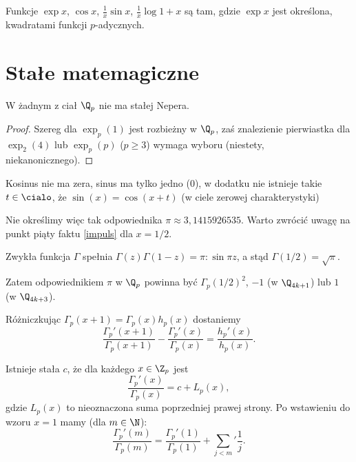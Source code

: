 \begin{fakt}
	Funkcje $\exp x$, $\cos x$, $\frac 1x\sin x$, $\frac 1 x \log 1 + x$ są tam, gdzie $\exp x$ jest określona, kwadratami funkcji $p$-adycznych. %
\end{fakt}

\section{Stałe matemagiczne}
\begin{fakt}
	W żadnym  z ciał $\Q_p$ nie ma stałej Nepera.
\end{fakt}

\begin{proof}
	Szereg  dla $\exp_p(1)$ jest rozbieżny w $\Q_p$, zaś znalezienie pierwiastka dla $\exp_2(4)$ lub $\exp_p(p)$ ($p \ge 3$) wymaga  wyboru (niestety, niekanonicznego).
\end{proof}

\begin{fakt}
	Kosinus  nie ma zera, sinus ma tylko jedno ($0$), w dodatku nie istnieje takie $t \in \cialo$, że $\sin (x) = \cos (x + t)$ (w ciele zerowej charakterystyki)
\end{fakt}

Nie określimy więc tak odpowiednika $\pi \approx 3,1415926535$.
Warto zwrócić uwagę na punkt piąty faktu \ref{impuls} dla $x = 1/2$.

\begin{fakt}
	Zwykła  funkcja $\Gamma$ spełnia $\Gamma (z) \Gamma(1-z) = \pi : \sin \pi z$, a stąd $\Gamma (1/2) = \sqrt{\pi}$.
\end{fakt}

Zatem odpowiednikiem $\pi$ w $\Q_p$ powinna być $\Gamma_p(1/2)^2$, $-1$ (w $\Q_{4k+1}$) lub $1$ (w $\Q_{4k+3}$).

Różniczkując $\Gamma_p(x + 1) = \Gamma_p(x) h_p(x)$ dostaniemy
\[
	\frac{\Gamma_p'(x+1)}{\Gamma_p(x+1)} - \frac{\Gamma_p'(x)}{\Gamma_p(x)} = \frac{h_p'(x)}{h_p(x)}.
\]

Istnieje stała $c$, że dla każdego $x \in \Z_p$ jest
\[
	\frac{\Gamma_p'(x)}{\Gamma_p(x)} = c + L_p(x),
\]
gdzie $L_p(x)$ to nieoznaczona suma poprzedniej prawej strony.
Po wstawieniu do wzoru $x = 1$ mamy (dla $m \in \N$):
\[
	\frac{\Gamma_p'(m)}{\Gamma_p(m)} = \frac{\Gamma_p'(1)}{\Gamma_p(1)} + \sum_{j < m}' \frac 1 j.
\]


